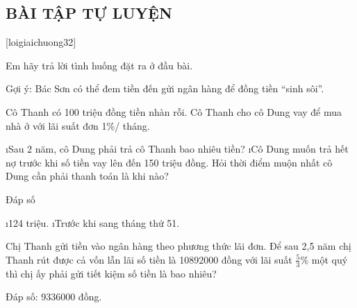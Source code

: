 \subsection{BÀI TẬP TỰ LUYỆN}
[loigiaichuong32]
\begin{bt}
	Em hãy trả lời tình huống đặt ra ở đầu bài.
	\begin{loigiaichuong32}
		Gợi ý: Bác Sơn có thể đem tiền đến gửi ngân hàng để đồng tiền “sinh sôi”.
	\end{loigiaichuong32}
\end{bt}
\begin{bt}
	Cô Thanh có 100 triệu đồng tiền nhàn rỗi. Cô Thanh cho cô Dung vay để mua nhà ở với lãi suất đơn 1\%/ tháng.
	\begin{enumerate}[a),leftmargin=*]
		\i Sau 2 năm, cô Dung phải trả cô Thanh bao nhiêu tiền?
		\i Cô Dung muốn trả hết nợ trước khi số tiền vay lên đến 150 triệu đồng. Hỏi thời điểm muộn nhất cô Dung cần phải thanh toán là khi nào?
	\end{enumerate}
	\begin{loigiaichuong32}
		Đáp số
		\begin{enumerate}[a),leftmargin=*]
			\i 124 triệu.
			\i Trước khi sang tháng thứ 51.
		\end{enumerate}
	\end{loigiaichuong32}
\end{bt}
\begin{bt}
	Chị Thanh gửi tiền vào ngân hàng theo phương thức lãi đơn. Để sau 2,5 năm chị Thanh rút được cả vốn lẫn lãi số tiền là 10892000 đồng với lãi suất $\frac{5}{3}$\% một quý thì chị ấy  phải gửi tiết kiệm số tiền là bao nhiêu?
	\begin{loigiaichuong32}
		Đáp số: 9336000 đồng.
	\end{loigiaichuong32}
\end{bt}
